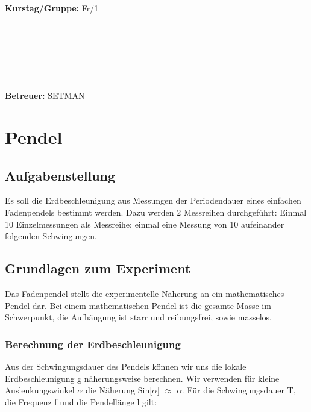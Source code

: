 \documentclass{article}
\begin{document}
\begin{verbatim}


\end{verbatim}
			\begin{flushleft}
			\textbf{\Large{Kurstag/Gruppe:}} \Large{Fr/1}
			\end{flushleft}

\begin{verbatim}






\end{verbatim}
			\begin{flushleft}
			\LARGE{\textbf{Betreuer:}}	\Large{SETMAN}	
			\end{flushleft}
\section{Pendel}	
\subsection{Aufgabenstellung}
Es soll die Erdbeschleunigung aus Messungen der Periodendauer eines einfachen Fadenpendels bestimmt werden. Dazu werden 2 Messreihen durchgeführt: Einmal 10 Einzelmessungen als Messreihe; einmal eine Messung von 10 aufeinander folgenden Schwingungen.
\subsection{Grundlagen zum Experiment}
Das Fadenpendel stellt die experimentelle Näherung an ein mathematisches Pendel dar. Bei einem mathematischen Pendel ist die gesamte Masse im Schwerpunkt, die Aufhängung ist starr und reibungsfrei, sowie masselos.
\subsubsection*{Berechnung der Erdbeschleunigung}
Aus der Schwingungsdauer des Pendels können wir uns die lokale Erdbeschleunigung g näherungsweise berechnen. Wir verwenden für kleine Auslenkungswinkel $\alpha$ die Näherung Sin[$\alpha$] $\approx$ $\alpha$. 
Für die Schwingungsdauer T, die Frequenz f und die Pendellänge l gilt:
\end{document}
